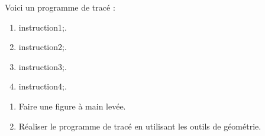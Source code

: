 \documentclass[exercice]{thedocument}%
\begin{document}
%
\begin{minipage}[p]{.35\linewidth}
    Voici un programme de tracé :
    \begin{mdframed}
        \begin{enumerate}[label=\alph* -,font=\bfseries]
            \item \<instruction1;.
            \item \<instruction2;.
            \item \<instruction3;.
            \item \<instruction4;.
        \end{enumerate}
    \end{mdframed}
    \begin{enumerate}
        \item Faire une figure à main levée.
        \item Réaliser le programme de tracé en utilisant les outils de géométrie.
    \end{enumerate}
\end{minipage}
\end{document}
